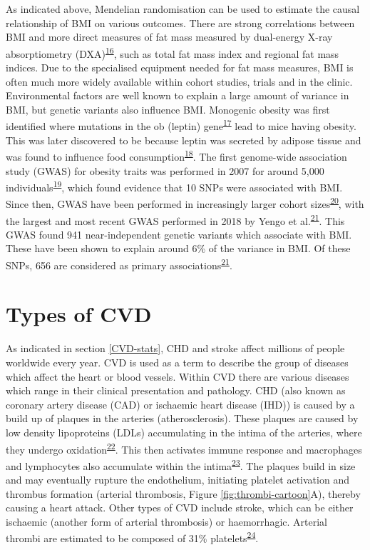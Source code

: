 \documentclass[11pt,twoside]{bristolthesis}
\begin{document}
As indicated above, Mendelian randomisation can be used to estimate the causal relationship of BMI on various outcomes. There are strong correlations between BMI and more direct measures of fat mass measured by dual-energy X-ray absorptiometry (DXA)\textsuperscript{\protect\hyperlink{ref-Bell2018}{16}}, such as total fat mass index and regional fat mass indices. Due to the specialised equipment needed for fat mass measures, BMI is often much more widely available within cohort studies, trials and in the clinic. Environmental factors are well known to explain a large amount of variance in BMI, but genetic variants also influence BMI. Monogenic obesity was first identified where mutations in the ob (leptin) gene\textsuperscript{\protect\hyperlink{ref-Zhang1994}{17}} lead to mice having obesity. This was later discovered to be because leptin was secreted by adipose tissue and was found to influence food consumption\textsuperscript{\protect\hyperlink{ref-Friedman1998}{18}}. The first genome-wide association study (GWAS) for obesity traits was performed in 2007 for around 5,000 individuals\textsuperscript{\protect\hyperlink{ref-Scuteri2007}{19}}, which found evidence that 10 SNPs were associated with BMI. Since then, GWAS have been performed in increasingly larger cohort sizes\textsuperscript{\protect\hyperlink{ref-Locke2015}{20}}, with the largest and most recent GWAS performed in 2018 by Yengo et al.\textsuperscript{\protect\hyperlink{ref-Yengo2018}{21}}. This GWAS found 941 near-independent genetic variants which associate with BMI. These have been shown to explain around 6\% of the variance in BMI. Of these SNPs, 656 are considered as primary associations\textsuperscript{\protect\hyperlink{ref-Yengo2018}{21}}.

\hypertarget{types-of-cvd}{%
\section{Types of CVD}\label{types-of-cvd}}

As indicated in section \ref{CVD-stats}, CHD and stroke affect millions of people worldwide every year. CVD is used as a term to describe the group of diseases which affect the heart or blood vessels. Within CVD there are various diseases which range in their clinical presentation and pathology. CHD (also known as coronary artery disease (CAD) or ischaemic heart disease (IHD)) is caused by a build up of plaques in the arteries (atherosclerosis). These plaques are caused by low density lipoproteins (LDLs) accumulating in the intima of the arteries, where they undergo oxidation\textsuperscript{\protect\hyperlink{ref-Bentzon2014}{22}}. This then activates immune response and macrophages and lymphocytes also accumulate within the intima\textsuperscript{\protect\hyperlink{ref-Badimon2012}{23}}. The plaques build in size and may eventually rupture the endothelium, initiating platelet activation and thrombus formation (arterial thrombosis, Figure \ref{fig:thrombi-cartoon}A), thereby causing a heart attack. Other types of CVD include stroke, which can be either ischaemic (another form of arterial thrombosis) or haemorrhagic. Arterial thrombi are estimated to be composed of 31\% platelets\textsuperscript{\protect\hyperlink{ref-Chernysh2020}{24}}.
\end{document}
